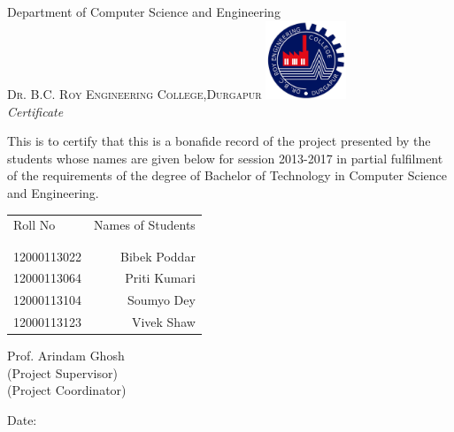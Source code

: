\newpage
\thispagestyle{empty}

\begin{center}

\huge{Department of Computer Science and Engineering}\\[0.5cm]
\normalsize
\textsc{Dr. B.C. Roy Engineering College,Durgapur}
\vfill
\includegraphics[width=0.18\textwidth]{./logo}\\[0.1in]

\emph{\LARGE Certificate}\\[1cm]
\end{center}
\normalsize This is to certify that this is a bonafide record of the project presented by the students whose names are given below for session 2013-2017 in partial fulfilment of the requirements of the degree of Bachelor of Technology in Computer Science and Engineering.\\[1.0cm]

\begin{table}[h]
\centering
\begin{tabular}{lr}
Roll No & Names of Students \\ \\ \hline
\\
12000113022 & Bibek Poddar \\
12000113064 & Priti Kumari  \\
12000113104 & Soumyo Dey \\ 
12000113123 & Vivek Shaw \\
\end{tabular}
\end{table}

\vfill


\begin{flushright}
Prof. Arindam Ghosh\\
(Project Supervisor)\\[1.5cm]
(Project Coordinator)\\
\end{flushright}

\begin{flushleft}
Date:
\end{flushleft}
